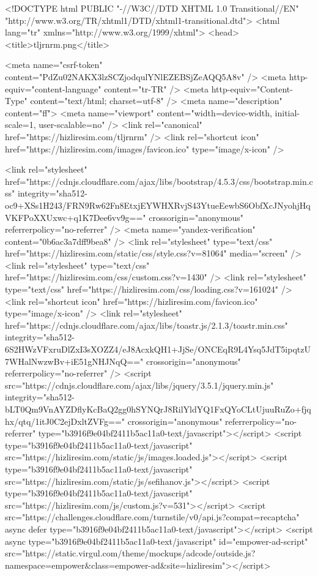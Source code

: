 <!DOCTYPE html PUBLIC "-//W3C//DTD XHTML 1.0 Transitional//EN" "http://www.w3.org/TR/xhtml1/DTD/xhtml1-transitional.dtd">
<html lang="tr" xmlns="http://www.w3.org/1999/xhtml">
<head>
<title>tljrnrm.png</title>

<meta name="csrf-token" content="PdZu02NAKX3lzSCZjodqulYNlEZEBSjZeAQQ5A8v" />
<meta http-equiv="content-language" content="tr-TR" />
<meta http-equiv="Content-Type" content="text/html; charset=utf-8" />
<meta name="description" content="ff">
<meta name="viewport" content="width=device-width, initial-scale=1, user-scalable=no" />
<link rel="canonical" href="https://hizliresim.com/tljrnrm" />
<link rel="shortcut icon" href="https://hizliresim.com/images/favicon.ico" type="image/x-icon" />


<link rel="stylesheet" href="https://cdnjs.cloudflare.com/ajax/libs/bootstrap/4.5.3/css/bootstrap.min.css" integrity="sha512-oc9+XSs1H243/FRN9Rw62Fn8EtxjEYWHXRvjS43YtueEewbS6ObfXcJNyohjHqVKFPoXXUxwc+q1K7Dee6vv9g==" crossorigin="anonymous" referrerpolicy="no-referrer" />
<meta name="yandex-verification" content="0b6ac3a7dff9bea8" />
<link rel="stylesheet" type="text/css" href="https://hizliresim.com/static/css/style.css?v=81064" media="screen" />
<link rel="stylesheet" type="text/css" href="https://hizliresim.com/css/custom.css?v=1430" />
<link rel="stylesheet" type="text/css" href="https://hizliresim.com/css/loading.css?v=161024" />
<link rel="shortcut icon" href="https://hizliresim.com/favicon.ico" type="image/x-icon" />
<link rel="stylesheet" href="https://cdnjs.cloudflare.com/ajax/libs/toastr.js/2.1.3/toastr.min.css" integrity="sha512-6S2HWzVFxruDlZxI3sXOZZ4/eJ8AcxkQH1+JjSe/ONCEqR9L4Ysq5JdT5ipqtzU7WHalNwzwBv+iE51gNHJNqQ==" crossorigin="anonymous" referrerpolicy="no-referrer" />
<script src="https://cdnjs.cloudflare.com/ajax/libs/jquery/3.5.1/jquery.min.js" integrity="sha512-bLT0Qm9VnAYZDflyKcBaQ2gg0hSYNQrJ8RilYldYQ1FxQYoCLtUjuuRuZo+fjqhx/qtq/1itJ0C2ejDxltZVFg==" crossorigin="anonymous" referrerpolicy="no-referrer" type="b3916f9e04bf2411b5ac11a0-text/javascript"></script>
<script type="b3916f9e04bf2411b5ac11a0-text/javascript" src="https://hizliresim.com/static/js/images.loaded.js"></script>
<script type="b3916f9e04bf2411b5ac11a0-text/javascript" src="https://hizliresim.com/static/js/sefihanov.js"></script>
<script type="b3916f9e04bf2411b5ac11a0-text/javascript" src="https://hizliresim.com/js/custom.js?v=531"></script>
<script src="https://challenges.cloudflare.com/turnstile/v0/api.js?compat=recaptcha" async defer type="b3916f9e04bf2411b5ac11a0-text/javascript"></script>
<script async type="b3916f9e04bf2411b5ac11a0-text/javascript" id="empower-ad-script" src="https://static.virgul.com/theme/mockups/adcode/outside.js?namespace=empower&class=empower-ad&site=hizliresim"></script>

